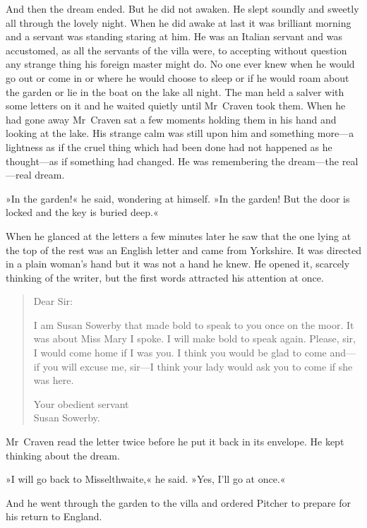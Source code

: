 And then the dream ended. But he did not awaken. He slept soundly and sweetly all through the lovely night. When he did awake at last it was brilliant morning and a servant was standing staring at him. He was an Italian servant and was accustomed, as all the servants of the villa were, to accepting without question any strange thing his foreign master might do. No one ever knew when he would go out or come in or where he would choose to sleep or if he would roam about the garden or lie in the boat on the lake all night. The man held a salver with some letters on it and he waited quietly until Mr~Craven took them. When he had gone away Mr~Craven sat a few moments holding them in his hand and looking at the lake. His strange calm was still upon him and something more—a lightness as if the cruel thing which had been done had not happened as he thought—as if something had changed. He was remembering the dream—the real—real dream.

»In the garden!« he said, wondering at himself. »In the garden! But the door is locked and the key is buried deep.«

When he glanced at the letters a few minutes later he saw that the one lying at the top of the rest was an English letter and came from Yorkshire. It was directed in a plain woman's hand but it was not a hand he knew. He opened it, scarcely thinking of the writer, but the first words attracted his attention at once.

\begin{quotation}
\noindent Dear Sir:

I am Susan Sowerby that made bold to speak to you once on the moor. It was about Miss Mary I spoke. I will make bold to speak again. Please, sir, I would come home if I was you. I think you would be glad to come and—if you will excuse me, sir—I think your lady would ask you to come if she was here.

\begin{flushright}
Your obedient servant\\
Susan Sowerby.
\end{flushright}
\end{quotation}

Mr~Craven read the letter twice before he put it back in its envelope. He kept thinking about the dream.

»I will go back to Misselthwaite,« he said. »Yes, I'll go at once.«

And he went through the garden to the villa and ordered Pitcher to prepare for his return to England.

